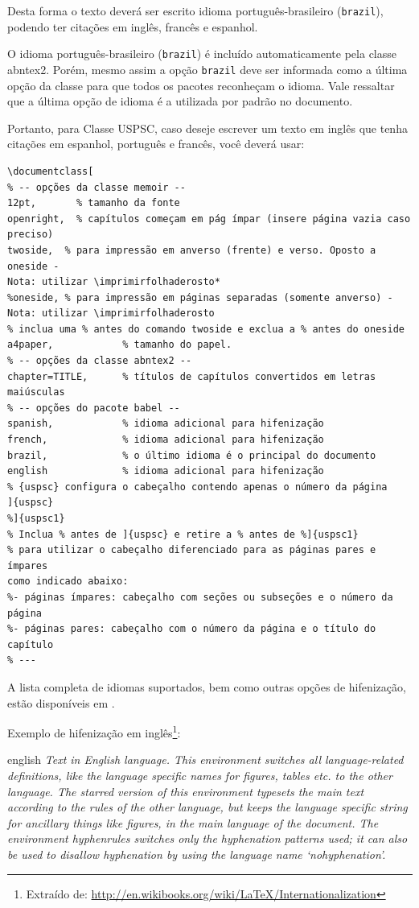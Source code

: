Desta forma o texto deverá ser escrito idioma português-brasileiro (\texttt{brazil}), podendo ter citações em inglês, francês e espanhol.

O idioma português-brasileiro (\texttt{brazil}) é incluído automaticamente pela
classe \textsf{abntex2}. Porém, mesmo assim a opção \texttt{brazil} deve ser
informada como a última opção da classe para que todos os pacotes reconheçam o
idioma. Vale ressaltar que a última opção de idioma é a utilizada por padrão no
documento. 

Portanto, para Classe USPSC, caso deseje escrever um texto em inglês que tenha
citações em espanhol, português e francês, você deverá usar:

\begin{verbatim}
\documentclass[
% -- opções da classe memoir --
12pt,		% tamanho da fonte
openright,	% capítulos começam em pág ímpar (insere página vazia caso 
preciso)
twoside,  % para impressão em anverso (frente) e verso. Oposto a oneside - 
Nota: utilizar \imprimirfolhaderosto*
%oneside, % para impressão em páginas separadas (somente anverso) -  
Nota: utilizar \imprimirfolhaderosto
% inclua uma % antes do comando twoside e exclua a % antes do oneside 
a4paper,			% tamanho do papel. 
% -- opções da classe abntex2 --
chapter=TITLE,		% títulos de capítulos convertidos em letras 
maiúsculas
% -- opções do pacote babel --
spanish,			% idioma adicional para hifenização
french,				% idioma adicional para hifenização
brazil,				% o último idioma é o principal do documento
english 			% idioma adicional para hifenização
% {uspsc} configura o cabeçalho contendo apenas o número da página
]{uspsc}
%]{uspsc1}
% Inclua % antes de ]{uspsc} e retire a % antes de %]{uspsc1}
% para utilizar o cabeçalho diferenciado para as páginas pares e ímpares 
como indicado abaixo:
%- páginas ímpares: cabeçalho com seções ou subseções e o número da página
%- páginas pares: cabeçalho com o número da página e o título do capítulo 
% ---
\end{verbatim}

A lista completa de idiomas suportados, bem como outras opções de hifenização,
estão disponíveis em .

Exemplo de hifenização em inglês\footnote{Extraído de:
	\url{http://en.wikibooks.org/wiki/LaTeX/Internationalization}}:

\begin{otherlanguage*}{english}
	\textit{Text in English language. This environment switches all language-related
		definitions, like the language specific names for figures, tables etc. to the other
		language. The starred version of this environment typesets the main text
		according to the rules of the other language, but keeps the language specific
		string for ancillary things like figures, in the main language of the document.
		The environment hyphenrules switches only the hyphenation patterns used; it can
		also be used to disallow hyphenation by using the language name
		`nohyphenation'.}
\end{otherlanguage*}

